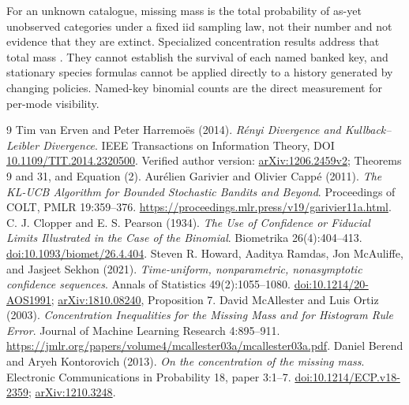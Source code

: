 \documentclass[11pt]{article}
\begin{document}
For an unknown catalogue, missing mass is the total probability of as-yet
unobserved categories under a fixed iid sampling law, not their number and
not evidence that they are extinct. Specialized concentration results address
that total mass \cite{mcallester2003,berend2013}. They cannot establish the
survival of each named banked key, and stationary species formulas cannot be
applied directly to a history generated by changing policies. Named-key
binomial counts are the direct measurement for per-mode visibility.

\begin{thebibliography}{9}
 Tim van Erven and Peter Harremo\"es (2014).
\emph{R\'enyi Divergence and Kullback--Leibler Divergence}.
IEEE Transactions on Information Theory, DOI
\href{https://doi.org/10.1109/TIT.2014.2320500}{10.1109/TIT.2014.2320500}.
Verified author version: \href{https://arxiv.org/abs/1206.2459v2}{arXiv:1206.2459v2};
Theorems 9 and 31, and Equation (2).
 Aur\'elien Garivier and Olivier Capp\'e (2011).
\emph{The KL-UCB Algorithm for Bounded Stochastic Bandits and Beyond}.
Proceedings of COLT, PMLR 19:359--376.
\url{https://proceedings.mlr.press/v19/garivier11a.html}.
 C. J. Clopper and E. S. Pearson (1934).
\emph{The Use of Confidence or Fiducial Limits Illustrated in the Case of the Binomial}.
Biometrika 26(4):404--413.
\href{https://doi.org/10.1093/biomet/26.4.404}{doi:10.1093/biomet/26.4.404}.
 Steven R. Howard, Aaditya Ramdas, Jon McAuliffe, and Jasjeet Sekhon (2021).
\emph{Time-uniform, nonparametric, nonasymptotic confidence sequences}.
Annals of Statistics 49(2):1055--1080.
\href{https://doi.org/10.1214/20-AOS1991}{doi:10.1214/20-AOS1991};
\href{https://arxiv.org/abs/1810.08240}{arXiv:1810.08240}, Proposition 7.
 David McAllester and Luis Ortiz (2003).
\emph{Concentration Inequalities for the Missing Mass and for Histogram Rule Error}.
Journal of Machine Learning Research 4:895--911.
\url{https://jmlr.org/papers/volume4/mcallester03a/mcallester03a.pdf}.
 Daniel Berend and Aryeh Kontorovich (2013).
\emph{On the concentration of the missing mass}.
Electronic Communications in Probability 18, paper 3:1--7.
\href{https://doi.org/10.1214/ECP.v18-2359}{doi:10.1214/ECP.v18-2359};
\href{https://arxiv.org/abs/1210.3248}{arXiv:1210.3248}.
\end{thebibliography}
\end{document}
